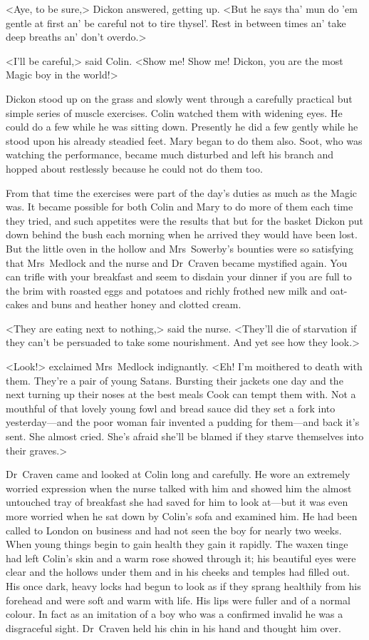 <Aye, to be sure,> Dickon answered, getting up. <But he says tha' mun do 'em gentle at first an' be careful not to tire thysel'. Rest in between times an' take deep breaths an' don't overdo.>

<I'll be careful,> said Colin. <Show me! Show me! Dickon, you are the most Magic boy in the world!>

Dickon stood up on the grass and slowly went through a carefully practical but simple series of muscle exercises. Colin watched them with widening eyes. He could do a few while he was sitting down. Presently he did a few gently while he stood upon his already steadied feet. Mary began to do them also. Soot, who was watching the performance, became much disturbed and left his branch and hopped about restlessly because he could not do them too.

From that time the exercises were part of the day's duties as much as the Magic was. It became possible for both Colin and Mary to do more of them each time they tried, and such appetites were the results that but for the basket Dickon put down behind the bush each morning when he arrived they would have been lost. But the little oven in the hollow and Mrs~Sowerby's bounties were so satisfying that Mrs~Medlock and the nurse and Dr~Craven became mystified again. You can trifle with your breakfast and seem to disdain your dinner if you are full to the brim with roasted eggs and potatoes and richly frothed new milk and oat-cakes and buns and heather honey and clotted cream.

<They are eating next to nothing,> said the nurse. <They'll die of starvation if they can't be persuaded to take some nourishment. And yet see how they look.>

<Look!> exclaimed Mrs~Medlock indignantly. <Eh! I'm moithered to death with them. They're a pair of young Satans. Bursting their jackets one day and the next turning up their noses at the best meals Cook can tempt them with. Not a mouthful of that lovely young fowl and bread sauce did they set a fork into yesterday—and the poor woman fair invented a pudding for them—and back it's sent. She almost cried. She's afraid she'll be blamed if they starve themselves into their graves.>

Dr~Craven came and looked at Colin long and carefully. He wore an extremely worried expression when the nurse talked with him and showed him the almost untouched tray of breakfast she had saved for him to look at—but it was even more worried when he sat down by Colin's sofa and examined him. He had been called to London on business and had not seen the boy for nearly two weeks. When young things begin to gain health they gain it rapidly. The waxen tinge had left Colin's skin and a warm rose showed through it; his beautiful eyes were clear and the hollows under them and in his cheeks and temples had filled out. His once dark, heavy locks had begun to look as if they sprang healthily from his forehead and were soft and warm with life. His lips were fuller and of a normal colour. In fact as an imitation of a boy who was a confirmed invalid he was a disgraceful sight. Dr~Craven held his chin in his hand and thought him over.

